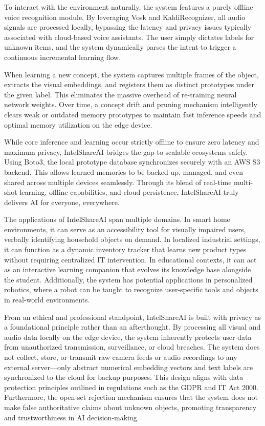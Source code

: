 \documentclass[12pt,a4paper]{report}
\begin{document}
To interact with the environment naturally, the system features a purely offline voice recognition module. By leveraging Vosk and KaldiRecognizer, all audio signals are processed locally, bypassing the latency and privacy issues typically associated with cloud-based voice assistants. The user simply dictates labels for unknown items, and the system dynamically parses the intent to trigger a continuous incremental learning flow. 

When learning a new concept, the system captures multiple frames of the object, extracts the visual embeddings, and registers them as distinct prototypes under the given label. This eliminates the massive overhead of re-training neural network weights. Over time, a concept drift and pruning mechanism intelligently clears weak or outdated memory prototypes to maintain fast inference speeds and optimal memory utilization on the edge device. 

While core inference and learning occur strictly offline to ensure zero latency and maximum privacy, IntelShareAI bridges the gap to scalable ecosystems safely. Using Boto3, the local prototype database synchronizes securely with an AWS S3 backend. This allows learned memories to be backed up, managed, and even shared across multiple devices seamlessly. Through its blend of real-time multi-shot learning, offline capabilities, and cloud persistence, IntelShareAI truly delivers AI for everyone, everywhere.

The applications of IntelShareAI span multiple domains. In smart home environments, it can serve as an accessibility tool for visually impaired users, verbally identifying household objects on demand. In localized industrial settings, it can function as a dynamic inventory tracker that learns new product types without requiring centralized IT intervention. In educational contexts, it can act as an interactive learning companion that evolves its knowledge base alongside the student. Additionally, the system has potential applications in personalized robotics, where a robot can be taught to recognize user-specific tools and objects in real-world environments.

From an ethical and professional standpoint, IntelShareAI is built with privacy as a foundational principle rather than an afterthought. By processing all visual and audio data locally on the edge device, the system inherently protects user data from unauthorized transmission, surveillance, or cloud breaches. The system does not collect, store, or transmit raw camera feeds or audio recordings to any external server---only abstract numerical embedding vectors and text labels are synchronized to the cloud for backup purposes. This design aligns with data protection principles outlined in regulations such as the GDPR and IT Act 2000. Furthermore, the open-set rejection mechanism ensures that the system does not make false authoritative claims about unknown objects, promoting transparency and trustworthiness in AI decision-making.
\end{document}
